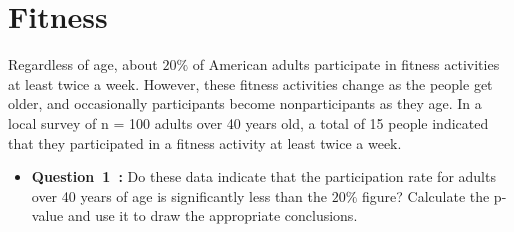 \section{Fitness}
\vspace{.2cm}

\noindent
Regardless of age, about $20\%$ of American adults participate in fitness activities at least twice a week.
However, these fitness activities change as the people get older, and occasionally participants become
nonparticipants as they age. In a local survey of n = 100 adults over 40 years old, a total of 15 people
indicated that they participated in a fitness activity at least twice a week.

\vspace{.2cm}



\begin{itemize}[label={},itemindent=-2em,leftmargin=2em]
    \item \textbf{Question~1~:} Do these data indicate that the participation rate for adults over 40 years of age is
    significantly less than the $20\%$ figure? Calculate the p-value and use it to draw the appropriate
    conclusions.
\end{itemize}
\vspace{.2cm}


